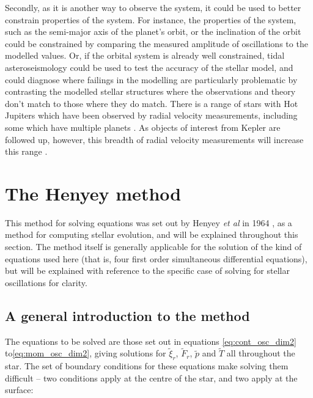 \documentclass[11pt]{amsart}
\begin{document}
Secondly, as it is another way to observe the system, it could be used to better constrain properties of the system.  For instance, the properties of the system, such as the semi-major axis of the planet's orbit, or the inclination of the orbit could be constrained by comparing the measured amplitude of oscillations to the modelled values.  Or, if the orbital system is already well constrained, tidal asteroseismology could be used to test the accuracy of the stellar model, and could diagnose where failings in the modelling are particularly problematic by contrasting the modelled stellar structures where the observations and theory don't match to those where they do match.  There is a range of stars with Hot Jupiters which have been observed by radial velocity measurements, including some which have multiple planets \cite{NASAExoplanet}.  As objects of interest from Kepler are followed up, however, this  breadth of radial velocity measurements will increase this range \cite{Crouzet2017}.


\fi








\section{The Henyey method}   \label{Henyey}

This method for solving equations was set out by Henyey \textit{et al} in 1964 \cite{Henyey1964}, as a method for computing stellar evolution, and will be explained throughout this section. The method itself is generally applicable for the solution of the kind of equations used here (that is, four first order simultaneous differential equations), but will be explained with reference to the specific case of solving for stellar oscillations for clarity.

\subsection{A general introduction to the method}  \label{Henyey:General}

The equations to be solved are those set out in equations \ref{eq:cont_osc_dim2} to\ref{eq:mom_osc_dim2}, giving solutions for $\tilde{\xi}_{r}$, $\tilde{F}_{r}$, $\tilde{p}$ and $\tilde{T}$ all throughout the star.  The set of boundary conditions for these equations make solving them difficult -- two conditions apply at the centre of the star, and two apply at the surface:
\end{document}
